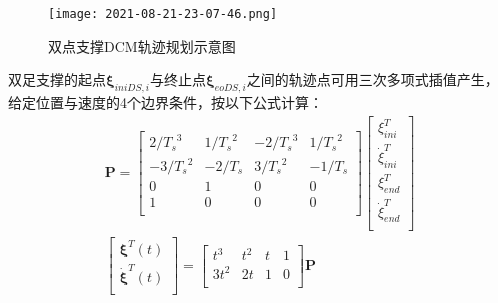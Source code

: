             \begin{figure}[h] 
                \centering
                \texttt{[image: 2021-08-21-23-07-46.png]}
                \caption{双点支撑DCM轨迹规划示意图} \label{fig2-5}
            \end{figure}
            \FloatBarrier

            双足支撑的起点$\boldsymbol{\xi}_{iniDS,i}$与终止点$\boldsymbol{\xi}_{eoDS,i}$之间的轨迹点可用三次多项式插值产生，给定位置与速度的4个边界条件，按以下公式计算：
            \begin{subequations}
                \begin{align}
                    \boldsymbol{P} = \left[
                    \begin{matrix}
                        2/{T_s}^3&		1/{T_s}^2&		-2/{T_s}^3&		1/{T_s}^2\\
                        -3/{T_s}^2&		-2/T_s&		3/{T_s}^2&		-1/T_s\\
                        0&		1&		0&		0\\
                        1&		0&		0&		0\\
                    \end{matrix} \right] \left[ 
                    \begin{array}{c}
                        \xi _{ini}^{T}\\
                        \dot{\xi}_{ini}^{T}\\
                        \xi _{end}^{T}\\
                        \dot{\xi}_{end}^{T}\\
                    \end{array} \right] 
                    \label{equ2-15a}\\
                    \left[ \begin{array}{c}
                        \boldsymbol{\xi }^T\left( t \right)\\
                        \boldsymbol{\dot{\xi}}^T\left( t \right)\\
                    \end{array} \right] =\left[ \begin{matrix}
                        t^3&		t^2&		t&		1\\
                        3t^2&		2t&		1&		0\\
                    \end{matrix} \right] \boldsymbol{P}
                    \label{equ2-15b}
                \end{align}
            \end{subequations}

